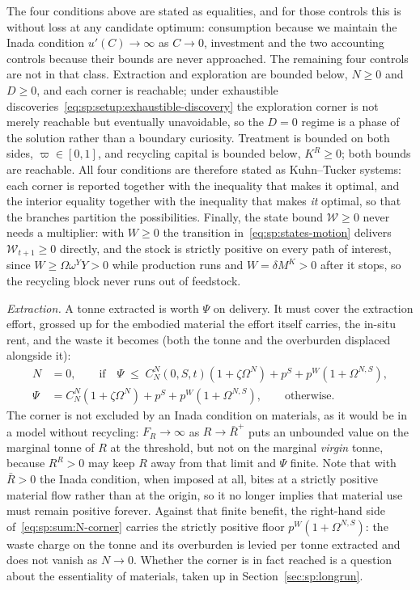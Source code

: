  The four conditions above are stated as equalities, and for
those controls this is without loss at any candidate optimum: consumption because we maintain the
Inada condition $u'\left(C\right)\to\infty$ as $C\to0$, investment and the two accounting controls
because their bounds are never approached. The remaining four controls are not in that class.
Extraction and exploration are bounded below, $N\ge0$ and $D\ge0$, and each corner is reachable;
under exhaustible discoveries~\eqref{eq:sp:setup:exhaustible-discovery} the exploration corner is
not merely reachable but eventually unavoidable, so the $D=0$ regime is a phase of the solution
rather than a boundary curiosity. Treatment is bounded on both sides, $\varpi\in\left[0,1\right]$,
and recycling capital is bounded below, $K^R\ge0$; both bounds are reachable. All four conditions
are therefore stated as Kuhn--Tucker systems: each corner is reported together with the inequality
that makes it optimal, and the interior equality together with the inequality that makes \emph{it}
optimal, so that the branches partition the possibilities. Finally, the state bound $\mathcal W\ge0$
never needs a multiplier: with $W\ge0$ the transition in~\eqref{eq:sp:states-motion} delivers
$\mathcal W_{t+1}\ge0$ directly, and the stock is strictly positive on every path of interest, since
$W\ge\Omega\omega^YY>0$ while production runs and $W=\delta M^K>0$ after it stops, so the recycling
block never runs out of feedstock.

\emph{Extraction.} A tonne extracted is worth $\Psi$ on delivery. It must cover the extraction
effort, grossed up for the embodied material the effort itself carries, the in-situ rent, and the
waste it becomes (both the tonne and the overburden displaced alongside it):
\begin{subequations}
\label{eq:sp:sum:Nsys}
\begin{align}
N &= 0,
\qquad \text{if}\quad
\Psi \;\le\; C^N_N\left(0,S,t\right)\left(1+\zeta\Omega^N\right)+p^S+p^W\left(1+\Omega^{N,S}\right),
\label{eq:sp:sum:N-corner}
\\
\Psi &= C^N_N\left(1+\zeta\Omega^N\right)+p^S+p^W\left(1+\Omega^{N,S}\right),
\qquad \text{otherwise.}
\label{eq:sp:sum:N}
\end{align}
\end{subequations}
The corner is not excluded by an Inada condition on materials, as it would be in a model without
recycling: $F_R\to\infty$ as $R\to\bar R^{+}$ puts an unbounded value on the marginal tonne of $R$
at the threshold, but not on the marginal \emph{virgin} tonne, because $R^R>0$ may keep $R$ away
from that limit and $\Psi$ finite. Note that with $\bar R>0$ the Inada condition, when imposed at
all, bites at a strictly positive material flow rather than at the origin, so it no longer implies
that material use must remain positive forever.
Against that finite benefit, the right-hand side of~\eqref{eq:sp:sum:N-corner} carries the strictly
positive floor $p^W\left(1+\Omega^{N,S}\right)$: the waste charge on the tonne and its overburden is
levied per tonne extracted and does not vanish as $N\to0$. Whether the corner is in fact reached is
a question about the essentiality of materials, taken up in Section~\ref{sec:sp:longrun}.

